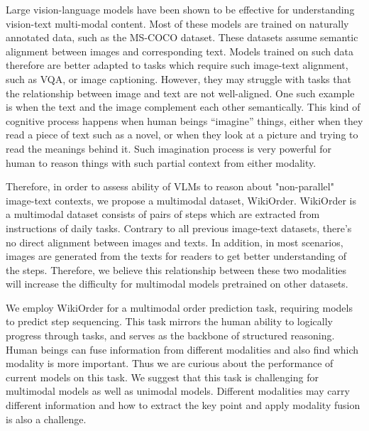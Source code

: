 \documentclass[11pt]{article}
\newcommand{\MY}[1]{\textcolor{orange}{(Mengyue: #1})}
\begin{document}
Large vision-language models have been shown to be effective for understanding vision-text multi-modal content. Most of these models are trained on naturally annotated data, such as the MS-COCO dataset\citep{lin2014microsoft}. These datasets assume semantic alignment between images and corresponding text. Models trained on such data therefore are better adapted to tasks which require such image-text alignment, such as VQA, or image captioning. However, they may struggle with tasks that the relationship between image and text are not well-aligned. One such example is when the text and the image complement each other semantically. This kind of cognitive process happens when human beings “imagine” things, either when they read a piece of text such as a novel, or when they look at a picture and trying to read the meanings behind it. Such imagination process is very powerful for human to reason things with such partial context from either modality. 

Therefore, in order to assess ability of VLMs to reason about "non-parallel" image-text contexts, we propose a multimodal dataset, WikiOrder. WikiOrder is a multimodal dataset consists of pairs of steps which are extracted from instructions of daily tasks. Contrary to all previous image-text datasets, there’s no direct alignment between images and texts. In addition, in most scenarios, images are generated from the texts for readers to get better understanding of the steps. Therefore, we believe this relationship between these two modalities will increase the difficulty for multimodal models pretrained on other datasets. 

We employ WikiOrder for a multimodal order prediction task, requiring models to predict step sequencing. This task mirrors the human ability to logically progress through tasks, and serves as the backbone of structured reasoning. Human beings can fuse information from different modalities and also find which modality is more important. Thus we are curious about the performance of current models on this task. We suggest that this task is challenging for multimodal models as well as unimodal models. Different modalities may carry different information and how to extract the key point and apply modality fusion is also a challenge. 
\end{document}
